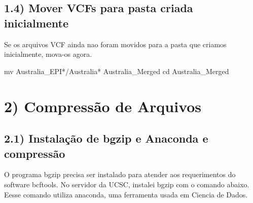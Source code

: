 \documentclass[
]{article}
\newenvironment{Shaded}{\begin{snugshade}}{\end{snugshade}}
\newcommand{\BuiltInTok}[1]{#1}
\newcommand{\ExtensionTok}[1]{#1}
\newcommand{\FunctionTok}[1]{\textcolor[rgb]{0.00,0.00,0.00}{#1}}
\newcommand{\KeywordTok}[1]{\textcolor[rgb]{0.13,0.29,0.53}{\textbf{#1}}}
\newcommand{\NormalTok}[1]{#1}
\newcommand{\StringTok}[1]{\textcolor[rgb]{0.31,0.60,0.02}{#1}}
\newcommand{\VariableTok}[1]{\textcolor[rgb]{0.00,0.00,0.00}{#1}}
\begin{document}
\begin{Shaded}
\end{Shaded}

\hypertarget{mover-vcfs-para-pasta-criada-inicialmente}{%
\subsection{1.4) Mover VCFs para pasta criada
inicialmente}\label{mover-vcfs-para-pasta-criada-inicialmente}}

Se os arquivos VCF ainda nao foram movidos para a pasta que criamos
inicialmente, mova-os agora.

\begin{Shaded}
\begin{Highlighting}[]
\FunctionTok{mv}\NormalTok{ Australia_EPI*/Australia* Australia_Merged}
\BuiltInTok{cd}\NormalTok{ Australia_Merged}
\end{Highlighting}
\end{Shaded}

\hypertarget{compressuxe3o-de-arquivos}{%
\section{2) Compressão de Arquivos}\label{compressuxe3o-de-arquivos}}

\hypertarget{instalauxe7uxe3o-de-bgzip-e-anaconda-e-compressuxe3o}{%
\subsection{2.1) Instalação de bgzip e Anaconda e
compressão}\label{instalauxe7uxe3o-de-bgzip-e-anaconda-e-compressuxe3o}}

O programa bgzip precisa ser instalado para atender aos requerimentos do
software bcftools. No servidor da UCSC, instalei bgzip com o comando
abaixo. Eesse comando utiliza anaconda, uma ferramenta usada em Ciencia
de Dados.

\begin{Shaded}
\end{Shaded}
\end{document}

